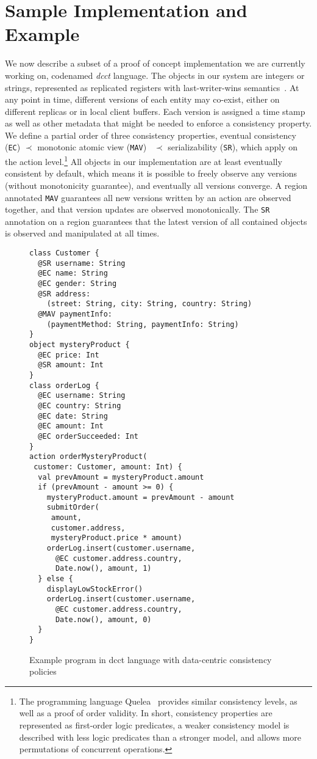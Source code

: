 \documentclass[preprint,numbers]{sigplanconf}
\begin{document}
\section{Sample Implementation and Example}
\label{sec:example}
We now describe a subset of a proof of concept implementation we are currently
working on, codenamed \emph{dcct} language.
The objects in our system are integers or strings,
represented as replicated registers with last-writer-wins
semantics~\cite{burckhardt2014replicated}. At any point in time, different
versions of each entity may
co-exist, either on different replicas or in local client buffers. Each version
is assigned a time stamp as well as other metadata that might be needed to
enforce a consistency property. We define a partial order of three consistency properties, eventual
consistency (\texttt{EC}) $\prec$ monotonic atomic view (\texttt{MAV})~\cite{bailis2013highly}  $\prec$
serializability (\texttt{SR}), which apply on the action level.\footnote{The programming language Quelea~\cite{sivaramakrishnan2015declarative} provides similar
consistency levels, as well as a proof of order validity. In short, consistency
properties are represented as first-order logic predicates, a weaker consistency
model is described with less logic predicates than a stronger model, and allows
more permutations of concurrent operations.} 
All objects in our implementation are at least eventually consistent by default, which means it
is possible to freely observe any versions (without monotonicity guarantee), and
eventually all versions converge. A region annotated \texttt{MAV} guarantees all new versions written by an
action are observed together, and that version updates are observed
monotonically. The \texttt{SR} annotation on a
region guarantees that the latest version of all
contained objects is observed and manipulated at all times. 

\begin{figure}[t!] 
\begin{lstlisting}[basicstyle=\small\ttfamily]
class Customer {
  @SR username: String
  @EC name: String
  @EC gender: String
  @SR address: 
    (street: String, city: String, country: String) 
  @MAV paymentInfo:
    (paymentMethod: String, paymentInfo: String)
}
object mysteryProduct {
  @EC price: Int
  @SR amount: Int
}
class orderLog {
  @EC username: String
  @EC country: String
  @EC date: String
  @EC amount: Int
  @EC orderSucceeded: Int
}
action orderMysteryProduct(
 customer: Customer, amount: Int) {
  val prevAmount = mysteryProduct.amount
  if (prevAmount - amount >= 0) {
    mysteryProduct.amount = prevAmount - amount
    submitOrder(
     amount, 
     customer.address, 
     mysteryProduct.price * amount)
    orderLog.insert(customer.username, 
      @EC customer.address.country, 
      Date.now(), amount, 1)
  } else {
    displayLowStockError() 
    orderLog.insert(customer.username, 
      @EC customer.address.country, 
      Date.now(), amount, 0)
  }
}
\end{lstlisting}
\caption{Example program in dcct language with data-centric consistency policies}
\label{fig:example}
\end{figure}
\end{document}
